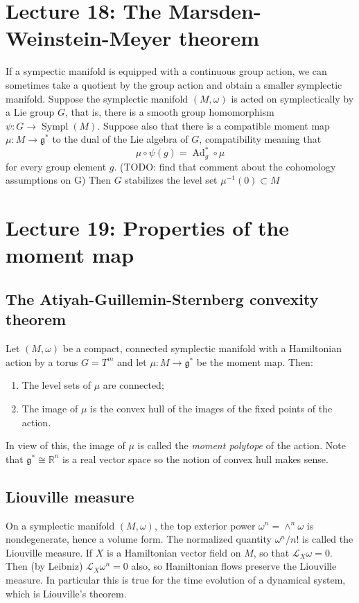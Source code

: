 \documentclass[11pt]{article} %
\begin{document}
\section*{Lecture 18: The Marsden-Weinstein-Meyer theorem}
If a sympectic manifold is equipped with a continuous group action, we can sometimes take a quotient by the group action and obtain a smaller symplectic manifold. Suppose the symplectic manifold $(M,\omega)$ is acted on symplectically by a Lie group $G$, that is, there is a smooth group homomorphism $\psi: G \rightarrow \operatorname{Sympl}(M)$. Suppose also that there is a compatible moment map $\mu: M \rightarrow \mathfrak{g}^\ast$ to the dual of the Lie algebra of $G$, compatibility meaning that
$$
\mu \circ \psi (g) = \operatorname{Ad}^\ast_g \circ \mu
$$
for every group element $g$.
(TODO: find that comment about the cohomology assumptions on G)
Then $G$ stabilizes the level set $\mu^{-1}(0) \subset M$


\section*{Lecture 19: Properties of the moment map}
\subsection*{The Atiyah-Guillemin-Sternberg convexity theorem}
Let $(M, \omega)$ be a compact, connected symplectic manifold with a Hamiltonian action by a torus $G = T^m$ and let $\mu: M \rightarrow \mathfrak{g}^\ast$ be the moment map. Then:
\begin{enumerate}
\item The level sets of $\mu$ are connected;
\item The image of $\mu$ is the convex hull of the images of the fixed points of the action.
\end{enumerate}
In view of this, the image of $\mu$ is called the \emph{moment polytope} of the action. Note that $\mathfrak{g}^\ast \cong \mathbb{R}^n$ is a real vector space so the notion of convex hull makes sense. 

\subsection*{Liouville measure}
On a symplectic manifold $(M, \omega)$, the top exterior power $\omega^n = \wedge^n \omega$ is nondegenerate, hence a volume form. The normalized quantity $\omega^n/n!$ is called the Liouville measure. If $X$ is a Hamiltonian vector field on $M$, so that $\mathscr{L}_X \omega = 0$. Then (by Leibniz) $\mathscr{L}_X \omega^n = 0$ also, so Hamiltonian flows preserve the Liouville measure. In particular this is true for the time evolution of a dynamical system, which is Liouville's theorem. 
\end{document}
